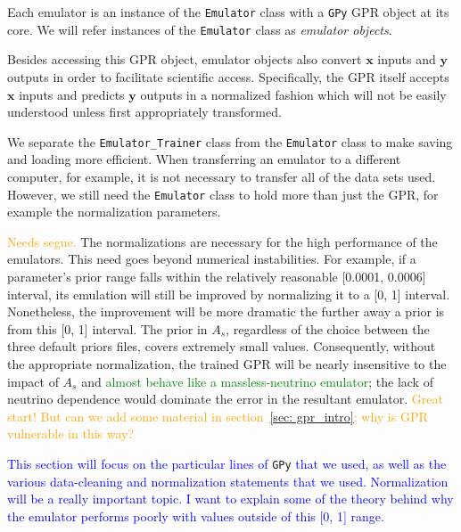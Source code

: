 Each emulator is an instance of
the \texttt{Emulator} class with a \texttt{GPy} GPR object at its core. We 
will refer instances of the \texttt{Emulator} class as \textit{emulator 
objects}.

Besides
accessing this GPR object, emulator objects also convert $\bm{x}$ inputs and
$\bm{y}$ outputs in order to facilitate scientific access. Specifically, 
the GPR itself accepts $\bm{x}$ inputs and predicts $\bm{y}$ outputs 
in a normalized fashion which will not be easily understood unless first 
appropriately transformed.

We separate the \verb|Emulator_Trainer| class from the \verb|Emulator| class
to make saving and loading more efficient. When transferring an emulator to a
different computer, for example, it is not necessary to transfer all of the
data sets used.
However, we still need the \verb|Emulator| class to hold more than just the 
GPR, for example the normalization parameters.




\textcolor{orange}{Needs segue.}
The normalizations are necessary for the high performance of the emulators. 
This need goes beyond numerical instabilities. For example, if a parameter's 
prior range falls within the relatively reasonable [0.0001, 0.0006] interval, 
its emulation will still be improved by normalizing it to a [0, 1] interval. 
Nonetheless, the improvement will be more dramatic the further away a prior is 
from this [0, 1] interval. The prior in $A_s$, regardless of the choice
between the three default priors files, covers extremely small values. Consequently, 
without the appropriate normalization, the trained GPR will be nearly 
insensitive to the impact of $A_s$ and \textcolor{green}{almost behave like a 
massless-neutrino emulator}; the lack of neutrino dependence would dominate 
the error in the resultant emulator.
\textcolor{orange}{Great start! But can we add some material in
section~\ref{sec: gpr_intro}: why is GPR vulnerable in this way?}
 
\textcolor{blue}{This section will focus on the particular lines of}
\verb|GPy| \textcolor{blue}{that we used, as well
as the various data-cleaning and normalization statements that we used.
Normalization will be a really important topic. I want to explain some of
the theory behind why the emulator performs poorly with values outside of this
[0, 1] range.}

